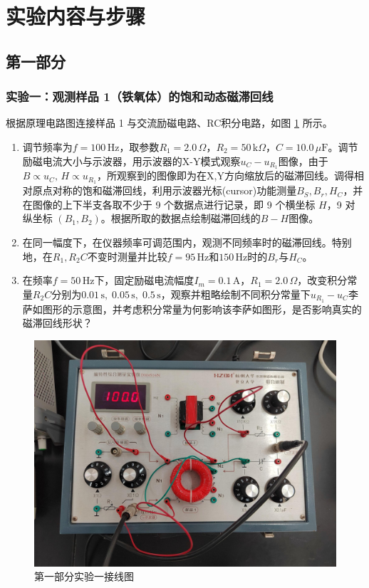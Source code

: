 \documentclass[UTF8]{article}
\theoremstyle{MyLineTheoremStyle} %
\theoremstyle{MyBlockTheoremStyle} %
\theoremstyle{MySubsubsectionStyle} %
\begin{document}
\section{实验内容与步骤}

\subsection{第一部分}

\subsubsection{实验一：观测样品 1（铁氧体）的饱和动态磁滞回线}
根据原理电路图连接样品 1 与交流励磁电路、RC积分电路，如图 \ref{第一部分实验一接线图} 所示。

\begin{enumerate}
\item 调节频率为$ f=100\,\mathrm{Hz} $，取参数$ R_1=2.0\,\Omega $，$ R_2=50\,\mathrm k\Omega $，$ C=10.0\,\mu\mathrm F $。调节励磁电流大小与示波器，用示波器的X-Y模式观察$ u_C-u_{R_1} $图像，由于$ B\propto u_C,\,H\propto u_{R_1} $，所观察到的图像即为在X,Y方向缩放后的磁滞回线。调得相对原点对称的饱和磁滞回线，利用示波器光标(cursor)功能测量$ B_S,B_r,H_C $，并在图像的上下半支各取不少于 9 个数据点进行记录，即 9 个横坐标 $H$，9 对纵坐标 $(B_1, B_2)$。根据所取的数据点绘制磁滞回线的$ B-H $图像。
\item 在同一幅度下，在仪器频率可调范围内，观测不同频率时的磁滞回线。特别地，在$ R_1,R_2C $不变时测量并比较$ f=95\,\mathrm{Hz} $和$ 150\,\mathrm{Hz} $时的$ B_r $与$ H_C $。
\item 在频率$ f=50\,\mathrm{Hz} $下，固定励磁电流幅度$ I_m=0.1\,\mathrm A $，$ R_1=2.0\,\Omega $，改变积分常量$ R_2C $分别为$ 0.01\,\mathrm s,\;0.05\,\mathrm s,\;0.5\,\mathrm s $，观察并粗略绘制不同积分常量下$ u_{R_1}-u_C $李萨如图形的示意图，并考虑积分常量为何影响该李萨如图形，是否影响真实的磁滞回线形状？
\end{enumerate}

\begin{figure}[H]\centering
\includegraphics[width=0.6\columnwidth]{assets/1.1/第一部分实验一接线图.jpg}
\caption{第一部分实验一接线图}\label{第一部分实验一接线图}
\end{figure}
\end{document}
